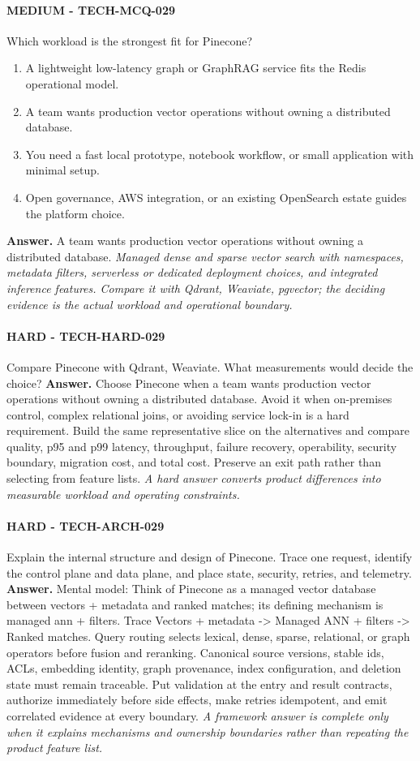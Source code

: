 \paragraph{MEDIUM - TECH-MCQ-029} Which workload is the strongest fit for Pinecone?
\begin{enumerate}[label=\Alph*.]
\item A lightweight low-latency graph or GraphRAG service fits the Redis operational model.
\item A team wants production vector operations without owning a distributed database.
\item You need a fast local prototype, notebook workflow, or small application with minimal setup.
\item Open governance, AWS integration, or an existing OpenSearch estate guides the platform choice.
\end{enumerate}
\textbf{Answer.} A team wants production vector operations without owning a distributed database.
\textit{Managed dense and sparse vector search with namespaces, metadata filters, serverless or dedicated deployment choices, and integrated inference features. Compare it with Qdrant, Weaviate, pgvector; the deciding evidence is the actual workload and operational boundary.}
\paragraph{HARD - TECH-HARD-029} Compare Pinecone with Qdrant, Weaviate. What measurements would decide the choice?
\textbf{Answer.} Choose Pinecone when a team wants production vector operations without owning a distributed database. Avoid it when on-premises control, complex relational joins, or avoiding service lock-in is a hard requirement. Build the same representative slice on the alternatives and compare quality, p95 and p99 latency, throughput, failure recovery, operability, security boundary, migration cost, and total cost. Preserve an exit path rather than selecting from feature lists.
\textit{A hard answer converts product differences into measurable workload and operating constraints.}
\paragraph{HARD - TECH-ARCH-029} Explain the internal structure and design of Pinecone. Trace one request, identify the control plane and data plane, and place state, security, retries, and telemetry.
\textbf{Answer.} Mental model: Think of Pinecone as a managed vector database between vectors + metadata and ranked matches; its defining mechanism is managed ann + filters. Trace Vectors + metadata -> Managed ANN + filters -> Ranked matches. Query routing selects lexical, dense, sparse, relational, or graph operators before fusion and reranking. Canonical source versions, stable ids, ACLs, embedding identity, graph provenance, index configuration, and deletion state must remain traceable. Put validation at the entry and result contracts, authorize immediately before side effects, make retries idempotent, and emit correlated evidence at every boundary.
\textit{A framework answer is complete only when it explains mechanisms and ownership boundaries rather than repeating the product feature list.}
